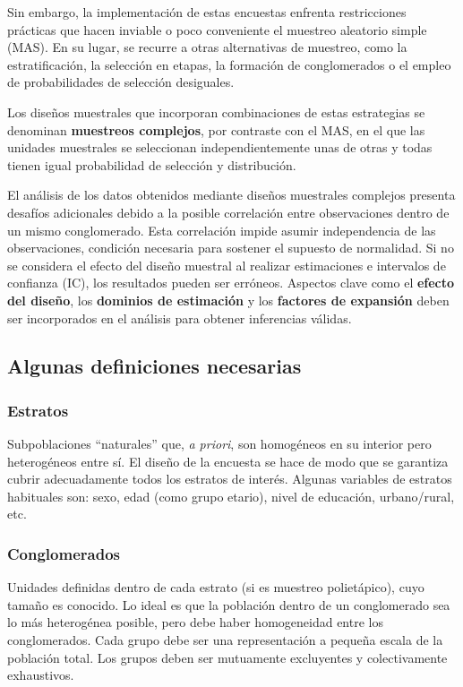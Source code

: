\documentclass[
  spanish,
  a4paper,
]{scrbook}
\begin{document}
Sin embargo, la implementación de estas encuestas enfrenta restricciones
prácticas que hacen inviable o poco conveniente el muestreo aleatorio
simple (MAS). En su lugar, se recurre a otras alternativas de muestreo,
como la estratificación, la selección en etapas, la formación de
conglomerados o el empleo de probabilidades de selección desiguales.

Los diseños muestrales que incorporan combinaciones de estas estrategias
se denominan \textbf{muestreos complejos}, por contraste con el MAS, en
el que las unidades muestrales se seleccionan independientemente unas de
otras y todas tienen igual probabilidad de selección y distribución.

El análisis de los datos obtenidos mediante diseños muestrales complejos
presenta desafíos adicionales debido a la posible correlación entre
observaciones dentro de un mismo conglomerado. Esta correlación impide
asumir independencia de las observaciones, condición necesaria para
sostener el supuesto de normalidad. Si no se considera el efecto del
diseño muestral al realizar estimaciones e intervalos de confianza (IC),
los resultados pueden ser erróneos. Aspectos clave como el
\textbf{efecto del diseño}, los \textbf{dominios de estimación} y los
\textbf{factores de expansión} deben ser incorporados en el análisis
para obtener inferencias válidas.

\subsection{Algunas definiciones
necesarias}\label{algunas-definiciones-necesarias}

\subsubsection{Estratos}\label{estratos}

Subpoblaciones ``naturales'' que, \emph{a priori}, son homogéneos en su
interior pero heterogéneos entre sí. El diseño de la encuesta se hace de
modo que se garantiza cubrir adecuadamente todos los estratos de
interés. Algunas variables de estratos habituales son: sexo, edad (como
grupo etario), nivel de educación, urbano/rural, etc.

\subsubsection{Conglomerados}\label{conglomerados}

Unidades definidas dentro de cada estrato (si es muestreo polietápico),
cuyo tamaño es conocido. Lo ideal es que la población dentro de un
conglomerado sea lo más heterogénea posible, pero debe haber
homogeneidad entre los conglomerados. Cada grupo debe ser una
representación a pequeña escala de la población total. Los grupos deben
ser mutuamente excluyentes y colectivamente exhaustivos.
\end{document}
